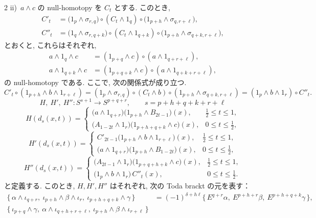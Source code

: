 \documentclass[10pt, leqno]{ltjsarticle}
\newcommand{\toda}[1]{\{\,#1\,\}}              %
\numberwithin{equation}{section}
\theoremstyle{plain}
\theoremstyle{definition}
\theoremstyle{remark}
\begin{document}
\begin{paracol}{2}
ii)\
$a \wedge c$ の null-homotopy を $C_t$ とする. このとき,
\[
\begin{aligned}
C'_{t}
& = \bigl(1_p \wedge \sigma_{r,q}\bigr)\circ 
(C_t \wedge 1_{q})\circ
\bigl(1_{p+h} \wedge \sigma_{q,r+\ell}\bigr),\\
C''_{t}
& = \bigl(1_q \wedge \sigma_{r,q+k}\bigr)\circ 
(C_t \wedge 1_{q+k})\circ
\bigl(1_{p+h} \wedge \sigma_{q+k,r+\ell}\bigr),
\end{aligned}
\]
とおくと, これらはそれぞれ, 
\[
\begin{align*}
a \wedge 1_{q} \wedge c
& = (1_{p+q} \wedge c) \circ (a \wedge 1_{q+r+\ell}),\\
a \wedge 1_{q+k} \wedge c
& = (1_{p+q+k} \wedge c) \circ (a \wedge 1_{q+k+r+\ell}),
\end{align*}
\]
の null-homotopy である. 
ここで, 次の関係式が成り立つ. 
\[
C'_t\circ(1_{p+h} \wedge b \wedge 1_{r+\ell})
= (1_p \wedge \sigma_{r,q})\circ(C_t \wedge b)\circ (1_{p+h} \wedge \sigma_{q+k,r+\ell})
= (1_p \wedge b \wedge 1_r) \circ C''_t.
\]
\[
H,\ H',\ H'':S^{s+1}\longrightarrow S^{p+q+r},\qquad
s=p+h+q+k+r+\ell
\]
\[
H(d_s(x,t))=
\begin{cases}
\bigl(a \wedge 1_{q+r}\bigr)\bigl(1_{p+h} \wedge B_{2t-1}\bigr)(x), & \frac12\le t\le1,\\[2pt]
\bigl(A_{1-2t} \wedge 1_r\bigr)\bigl(1_{p+h+q+k} \wedge c\bigr)(x), & 0\le t\le\frac12,
\end{cases}
\]
\[
H'(d_s(x,t))=
\begin{cases}
C'_{2t-1}\bigl(1_{p+h} \wedge b \wedge 1_{r+\ell}\bigr)(x), & \frac12\le t\le1,\\[2pt]
\bigl(a \wedge 1_{q+r}\bigr)\bigl(1_{p+h} \wedge B_{1-2t}\bigr)(x), & 0\le t\le\frac12,
\end{cases}
\]
\[
H''(d_s(x,t))=
\begin{cases}
\bigl(A_{2t-1} \wedge 1_r\bigr)\bigl(1_{p+q+h+k} \wedge c\bigr)(x), & \frac12\le t\le1,\\[2pt]
\bigl(1_p \wedge b \wedge 1_{r}\bigr)\, C''_t(x), & 0\le t\le\frac12 .
\end{cases}
\]
と定義する.
このとき, $H,H',H''$ はそれぞれ, 次の Toda brackt の元を表す：
\[
\begin{aligned}
\toda{\alpha\wedge\iota_{q+r},\ \iota_{p+h}\wedge\beta\wedge\iota_r,\ \iota_{p+h+q+k}\wedge\gamma}
& = (-1)^{\delta+h\ell}\toda{E^{q+r}\alpha,\ E^{p+h+r}\beta,\ E^{p+h+q+k}\gamma},\\
\toda{\iota_{p+q}\wedge\gamma,\ \alpha\wedge\iota_{q+h+r+\ell},\ \iota_{p+h}\wedge\beta\wedge\iota_{r+\ell}}

\end{aligned}\]
\end{paracol}
\end{document}

